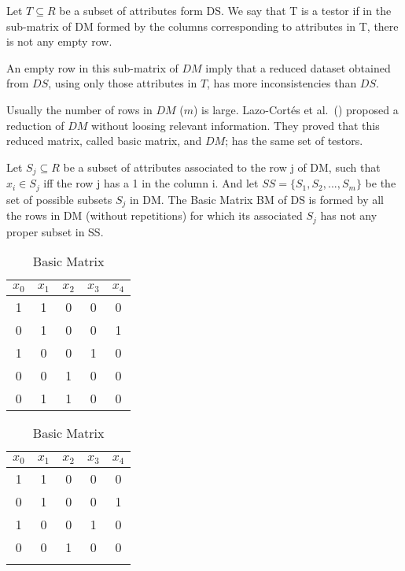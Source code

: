 \documentclass[citeauthoryear]{llncs}
\begin{document}
	\begin{definition}\label{def:testor}
		Let $T \subseteq R$ be a subset of attributes form DS. We say that T is a testor if in the sub-matrix
		of DM formed by the columns corresponding to attributes in T, there is not any empty row.
	\end{definition}
	
	An empty row in this sub-matrix of $DM$ imply that a reduced dataset obtained from $DS$, using only those 
	attributes in $T$, has more inconsistencies than $DS$. 	
	
	Usually the number of rows in $DM$ ($m$) is large. Lazo-Cort\'es et al.~(\cite{Lazo2001}) proposed a reduction
	of $DM$ without loosing relevant information. They proved that this reduced matrix, called basic matrix, and
	$DM$; has the same set of testors. 
	
	\begin{definition} \label{def:BM}
		Let $S_{j} \subseteq R$ be a subset of attributes associated to the row j of DM, such that $x_i \in S_{j}$
		iff the row j has a 1 in the column i. And let $SS=\lbrace S_1, S_2,...,S_m  \rbrace$ be the set of
		possible subsets $S_{j}$ in DM. The Basic Matrix BM of DS is formed by all the rows in DM (without
		repetitions) for which its associated $S_{j}$ has not any proper subset in SS.
	\end{definition}
	
	\begin{table}[!htb]
    \begin{minipage}{.5\linewidth}
      \caption{Discernibility Matrix}
      \centering
        \begin{tabular}{ccccc}\label{tab:DM}
            $x_0$ & $x_1$ & $x_2$ & $x_3$ & $x_4$\\
        		\hline
        		1&1&0&0&0\\
        		0&1&0&0&1\\
        		1&0&0&1&0\\
        		0&0&1&0&0\\
        		0&1&1&0&0\\
        \end{tabular}
    \end{minipage}%
    \begin{minipage}{.5\linewidth}
      \centering
        \caption{Basic Matrix}
        \begin{tabular}{ccccc}\label{tab:BM}
            $x_0$ & $x_1$ & $x_2$ & $x_3$ & $x_4$\\
        		\hline
        		1&1&0&0&0\\
        		0&1&0&0&1\\
        		1&0&0&1&0\\
        		0&0&1&0&0\\
        		\\
        \end{tabular}
    	\end{minipage} 
	\end{table}
	
\end{document}
